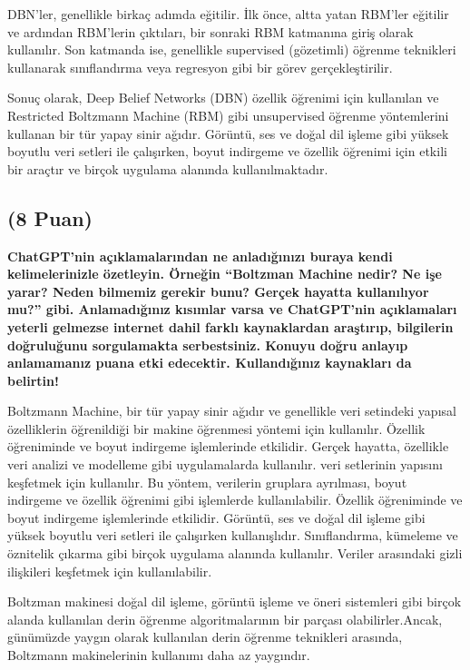 \documentclass[11pt]{article}
\begin{document}
DBN'ler, genellikle birkaç adımda eğitilir. İlk önce, altta yatan RBM'ler eğitilir ve ardından RBM'lerin çıktıları, bir sonraki RBM katmanına giriş olarak kullanılır. Son katmanda ise, genellikle supervised (gözetimli) öğrenme teknikleri kullanarak sınıflandırma veya regresyon gibi bir görev gerçekleştirilir.

Sonuç olarak, Deep Belief Networks (DBN) özellik öğrenimi için kullanılan ve Restricted Boltzmann Machine (RBM) gibi unsupervised öğrenme yöntemlerini kullanan bir tür yapay sinir ağıdır. Görüntü, ses ve doğal dil işleme gibi yüksek boyutlu veri setleri ile çalışırken, boyut indirgeme ve özellik öğrenimi için etkili bir araçtır ve birçok uygulama alanında kullanılmaktadır.




\subsection{(8 Puan)} \textbf{ChatGPT’nin açıklamalarından ne anladığınızı buraya kendi kelimelerinizle özetleyin. Örneğin ``Boltzman Machine nedir? Ne işe yarar? Neden bilmemiz gerekir bunu? Gerçek hayatta kullanılıyor mu?'' gibi. Anlamadığınız kısımlar varsa ve ChatGPT’nin açıklamaları yeterli gelmezse internet dahil farklı kaynaklardan araştırıp, bilgilerin doğruluğunu sorgulamakta serbestsiniz. Konuyu doğru anlayıp anlamamanız puana etki edecektir. Kullandığınız kaynakları da belirtin!}


Boltzmann Machine, bir tür yapay sinir ağıdır ve genellikle veri setindeki yapısal özelliklerin öğrenildiği bir makine öğrenmesi yöntemi için kullanılır. Özellik öğreniminde ve boyut indirgeme işlemlerinde etkilidir. Gerçek hayatta, özellikle veri analizi ve modelleme gibi uygulamalarda kullanılır.
 veri setlerinin yapısını keşfetmek için kullanılır. Bu yöntem, verilerin gruplara ayrılması, boyut indirgeme ve özellik öğrenimi gibi işlemlerde kullanılabilir.
 Özellik öğreniminde ve boyut indirgeme işlemlerinde etkilidir. Görüntü, ses ve doğal dil işleme gibi yüksek boyutlu veri setleri ile çalışırken kullanışlıdır. Sınıflandırma, kümeleme ve öznitelik çıkarma gibi birçok uygulama alanında kullanılır.
 Veriler arasındaki gizli ilişkileri keşfetmek için kullanılabilir.
 
 Boltzman makinesi doğal dil işleme, görüntü işleme ve öneri sistemleri gibi birçok alanda kullanılan derin öğrenme algoritmalarının bir parçası olabilirler.Ancak, günümüzde yaygın olarak kullanılan derin öğrenme teknikleri arasında, Boltzmann makinelerinin kullanımı daha az yaygındır.
\end{document}
